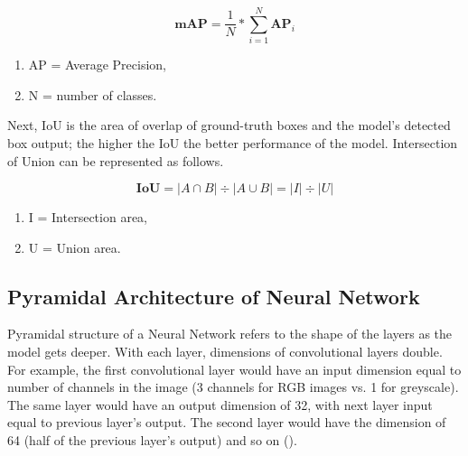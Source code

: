 \begin{equation}
	\textbf{mAP} = \frac{1}{N} * \sum_{i = 1}^{N} \textbf{AP}_i
\end{equation}

\begingroup
\fontsize{7pt}{9pt}\selectfont
\begin{enumerate}
	\item[]  \begin{center} AP = Average Precision, \end{center}
	\item[] \begin{center}  N = number of classes. \end{center}
\end{enumerate}
\endgroup


Next, IoU is the area of overlap of ground-truth boxes and the model's detected box output;
the higher the IoU the better performance of the model. Intersection of Union can be 
represented as follows.

\begin{equation}
	\textbf{IoU} = |A \cap B| \div  |A \cup B| = |I| \div |U|
\end{equation}

\begingroup
\fontsize{7pt}{9pt}\selectfont
\begin{enumerate}
	\item[]  \begin{center} I = Intersection area, \end{center}
	\item[] \begin{center}  U = Union area. \end{center}
\end{enumerate}
\endgroup


\subsection{Pyramidal Architecture of Neural Network}


Pyramidal structure of a Neural Network refers to the shape of the layers as the model
gets deeper. With each layer, dimensions of convolutional layers double.
For example, the first convolutional layer would have an input dimension equal to number of
channels in the image (3 channels for RGB images vs. 1 for greyscale). The same layer would have an output
dimension of 32, with next layer input equal to previous layer's output. The second layer
would have the dimension of 64 (half of the previous layer's output) and so on ().


